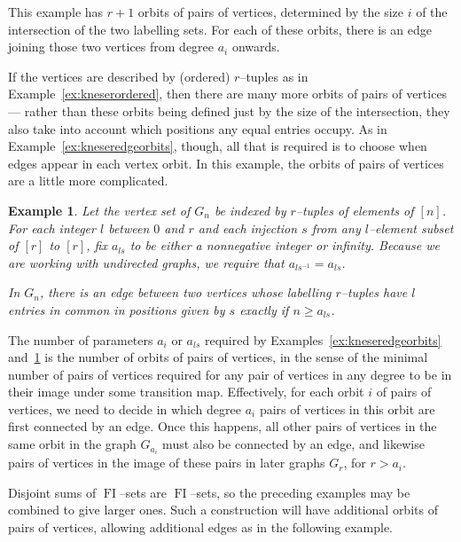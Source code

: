 \documentclass[10pt]{amsart}
\DeclareMathOperator{\FI}{FI}
\newtheorem{example}[theorem]{Example}
\theoremstyle{definition}
\begin{document}
This example has $r+1$ orbits of pairs of vertices, determined by the size $i$ of the intersection of the two labelling sets. For each of these orbits, there is an edge joining those two vertices from degree $a_i$ onwards.

If the vertices are described by (ordered) $r$--tuples as in Example~\ref{ex:kneserordered}, then there are many more orbits of pairs of vertices --- rather than these orbits being defined just by the size of the intersection, they also take into account which positions any equal entries occupy. As in Example~\ref{ex:kneseredgeorbits}, though, all that is required is to choose when edges appear in each vertex orbit. In this example, the orbits of pairs of vertices are a little more complicated.

\begin{example}\label{ex:kneserorderededgeorbits}
Let the vertex set of $G_n$ be indexed by $r$--tuples of elements of $[n]$. For each integer $l$ between $0$ and $r$ and each injection $s$ from any $l$--element subset of $[r]$ to $[r]$, fix $a_{ls}$ to be either a nonnegative integer or infinity. Because we are working with undirected graphs, we require that $a_{ls^{-1}} = a_{ls}$.

In $G_n$, there is an edge between two vertices whose labelling $r$--tuples have $l$ entries in common in positions given by $s$ exactly if $n \geq a_{ls}$. 
\end{example}

The number of parameters $a_i$ or $a_{ls}$ required by Examples~\ref{ex:kneseredgeorbits} and~\ref{ex:kneserorderededgeorbits} is the number of orbits of pairs of vertices, in the sense of the minimal number of pairs of vertices required for any pair of vertices in any degree to be in their image under some transition map. Effectively, for each orbit $i$ of pairs of vertices, we need to decide in which degree $a_i$ pairs of vertices in this orbit are first connected by an edge. Once this happens, all other pairs of vertices in the same orbit in the graph $G_{a_i}$ must also be connected by an edge, and likewise pairs of vertices in the image of these pairs in later graphs $G_r$, for $r > a_i$.

Disjoint sums of $\FI$--sets are $\FI$--sets, so the preceding examples may be combined to give larger ones. Such a construction will have additional orbits of pairs of vertices, allowing additional edges as in the following example.
\end{document}
